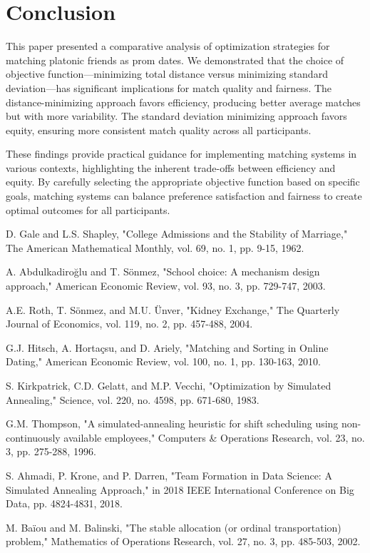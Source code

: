 \documentclass[10pt,journal,compsoc]{IEEEtran}
\begin{document}
\section{Conclusion}
This paper presented a comparative analysis of optimization strategies for matching platonic friends as prom dates. We demonstrated that the choice of objective function—minimizing total distance versus minimizing standard deviation—has significant implications for match quality and fairness. The distance-minimizing approach favors efficiency, producing better average matches but with more variability. The standard deviation minimizing approach favors equity, ensuring more consistent match quality across all participants.

These findings provide practical guidance for implementing matching systems in various contexts, highlighting the inherent trade-offs between efficiency and equity. By carefully selecting the appropriate objective function based on specific goals, matching systems can balance preference satisfaction and fairness to create optimal outcomes for all participants.

\begin{thebibliography}{00}
 D. Gale and L.S. Shapley, "College Admissions and the Stability of Marriage," The American Mathematical Monthly, vol. 69, no. 1, pp. 9-15, 1962.

 A. Abdulkadiroğlu and T. Sönmez, "School choice: A mechanism design approach," American Economic Review, vol. 93, no. 3, pp. 729-747, 2003.

 A.E. Roth, T. Sönmez, and M.U. Ünver, "Kidney Exchange," The Quarterly Journal of Economics, vol. 119, no. 2, pp. 457-488, 2004.

 G.J. Hitsch, A. Hortaçsu, and D. Ariely, "Matching and Sorting in Online Dating," American Economic Review, vol. 100, no. 1, pp. 130-163, 2010.

 S. Kirkpatrick, C.D. Gelatt, and M.P. Vecchi, "Optimization by Simulated Annealing," Science, vol. 220, no. 4598, pp. 671-680, 1983.

 G.M. Thompson, "A simulated-annealing heuristic for shift scheduling using non-continuously available employees," Computers \& Operations Research, vol. 23, no. 3, pp. 275-288, 1996.

 S. Ahmadi, P. Krone, and P. Darren, "Team Formation in Data Science: A Simulated Annealing Approach," in 2018 IEEE International Conference on Big Data, pp. 4824-4831, 2018.

 M. Baïou and M. Balinski, "The stable allocation (or ordinal transportation) problem," Mathematics of Operations Research, vol. 27, no. 3, pp. 485-503, 2002.
\end{thebibliography}
\end{document}
